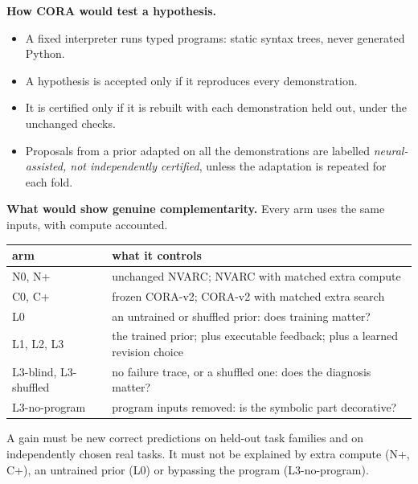 \documentclass[11pt]{article}
\begin{document}
\textbf{How CORA would test a hypothesis.}
\begin{itemize}
  \item A fixed interpreter runs typed programs: static syntax trees, never generated Python.
  \item A hypothesis is accepted only if it reproduces every demonstration.
  \item It is certified only if it is rebuilt with each demonstration held out, under the unchanged checks.
  \item Proposals from a prior adapted on all the demonstrations are labelled \emph{neural-assisted, not independently
        certified}, unless the adaptation is repeated for each fold.
\end{itemize}

\textbf{What would show genuine complementarity.} Every arm uses the same inputs, with compute accounted.
\begin{center}
\begin{tabular}{@{}ll@{}}
\toprule
arm & what it controls \\ \midrule
N0, N+ & unchanged NVARC; NVARC with matched extra compute \\
C0, C+ & frozen CORA-v2; CORA-v2 with matched extra search \\
L0 & an untrained or shuffled prior: does training matter? \\
L1, L2, L3 & the trained prior; plus executable feedback; plus a learned revision choice \\
L3-blind, L3-shuffled & no failure trace, or a shuffled one: does the diagnosis matter? \\
L3-no-program & program inputs removed: is the symbolic part decorative? \\ \bottomrule
\end{tabular}
\end{center}
A gain must be new correct predictions on held-out task families and on independently chosen real tasks. It must not
be explained by extra compute (N+, C+), an untrained prior (L0) or bypassing the program (L3-no-program).
\end{document}
